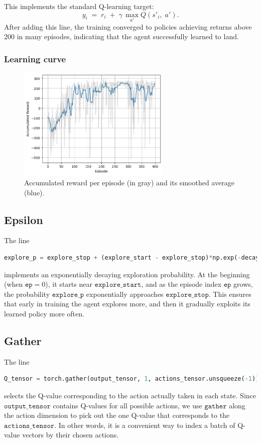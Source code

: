 This implements the standard Q-learning target:
\[
y_i \;=\; r_i \;+\; \gamma \,\max_{a'}Q(s'_i,\;a').
\]
After adding this line, the training converged to policies achieving returns above 200 in many episodes, indicating that the agent successfully learned to land.

\subsubsection*{Learning curve}
\begin{figure}[H]
  \centering
  \includegraphics[width=0.65\textwidth]{Code/output.png}
  \caption{Accumulated reward per episode (in gray) and its smoothed average (blue).}
\end{figure}

\subsection{Epsilon}
The line
\begin{lstlisting}[language=Python]
    explore_p = explore_stop + (explore_start - explore_stop)*np.exp(-decay_rate*ep)
\end{lstlisting}
implements an exponentially decaying exploration probability. At the beginning (when \(\texttt{ep} = 0\)), it starts near \(\texttt{explore\_start}\), and as the episode index \(\texttt{ep}\) grows, the probability \(\texttt{explore\_p}\) exponentially approaches \(\texttt{explore\_stop}\). This ensures that early in training the agent explores more, and then it gradually exploits its learned policy more often.

\subsection{Gather}
The line
\begin{lstlisting}[language=Python]
    Q_tensor = torch.gather(output_tensor, 1, actions_tensor.unsqueeze(-1)).squeeze()
\end{lstlisting}
selects the Q-value corresponding to the action actually taken in each state. Since \(\texttt{output\_tensor}\) contains Q-values for all possible actions, we use \(\texttt{gather}\) along the action dimension to pick out the one Q-value that corresponds to the \(\texttt{actions\_tensor}\). In other words, it is a convenient way to index a batch of Q-value vectors by their chosen actions.

